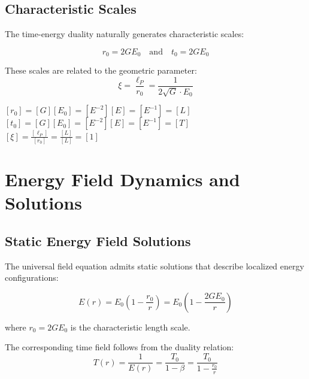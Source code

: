 \documentclass[12pt,a4paper]{article}
\theoremstyle{definition}
\begin{document}
\subsection{Characteristic Scales}

The time-energy duality naturally generates characteristic scales:

\begin{equation}
	\boxed{r_0 = 2GE_0} \quad \text{and} \quad \boxed{t_0 = 2GE_0}
\end{equation}

These scales are related to the geometric parameter:
\begin{equation}
	\xi = \frac{\ell_P}{r_0} = \frac{1}{2\sqrt{G} \cdot E_0}
\end{equation}

\begin{einheitencheck}
	$[r_0] = [G][E_0] = [E^{-2}][E] = [E^{-1}] = [L]$ \checkmark\\
	$[t_0] = [G][E_0] = [E^{-2}][E] = [E^{-1}] = [T]$ \checkmark\\
	$[\xi] = \frac{[\ell_P]}{[r_0]} = \frac{[L]}{[L]} = [1]$ \checkmark
\end{einheitencheck}


\section{Energy Field Dynamics and Solutions}

\subsection{Static Energy Field Solutions}

The universal field equation admits static solutions that describe localized energy configurations:

\begin{equation}
	\boxed{E(r) = E_0\left(1 - \frac{r_0}{r}\right) = E_0\left(1 - \frac{2GE_0}{r}\right)}
\end{equation}

where $r_0 = 2GE_0$ is the characteristic length scale.

The corresponding time field follows from the duality relation:
\begin{equation}
	T(r) = \frac{1}{E(r)} = \frac{T_0}{1 - \beta} = \frac{T_0}{1 - \frac{r_0}{r}}
\end{equation}
\end{document}
